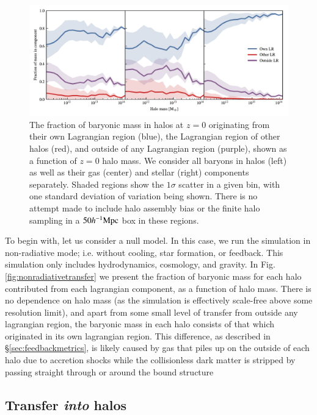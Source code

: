 \begin{figure}
	\centering
	\includegraphics{figures/s50j7kAHF/component_fraction_mixed.pdf}
	\vspace{-0.7cm}
	\caption{
		The fraction of baryonic mass in halos at $z=0$ originating from their own Lagrangian region (blue), the Lagrangian region of other halos (red), and outside of any Lagrangian region (purple), shown as a function of $z=0$ halo mass.
		We consider all baryons in halos (left) as well as their gas (center) and stellar (right) components separately. 
		Shaded regions show the $1\sigma$ scatter in a given bin, with one standard
		deviation of variation being shown. There is no attempt made to include
		halo assembly bias or the finite halo sampling in a $50h^{-1}{\rm Mpc}{}$ box in
		these regions.
	}
	\label{fig:maintransferresult}
\end{figure}

To begin with, let us consider a null model. In this case, we run the
simulation in non-radiative mode; i.e. without cooling, star formation, or
feedback. This simulation only includes hydrodynamics, cosmology, and
gravity. In Fig. \ref{fig:nonradiativetransfer} we present the fraction of
baryonic mass for each halo contributed from each lagrangian component, as a
function of halo mass. There is no dependence on halo mass (as the simulation
is effectively scale-free above some resolution limit), and apart from some
small level of transfer from outside any lagrangian region, the baryonic mass
in each halo consists of that which originated in its own lagrangian region.
This difference, as described in \S \ref{sec:feedbackmetrics}, is likely
caused by gas that piles up on the outside of each halo due to accretion
shocks while the collisionless dark matter is stripped by passing straight
through or around the bound structure


\subsection{Transfer \emph{into} halos}

